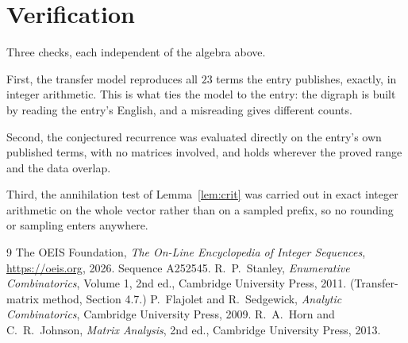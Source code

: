 \documentclass[11pt,a4paper]{article}
\theoremstyle{plain}
\theoremstyle{definition}
\begin{document}
\section{Verification}

Three checks, each independent of the algebra above.

First, the transfer model reproduces all $23$ terms the entry publishes, exactly, in
integer arithmetic. This is what ties the model to the entry: the digraph is built by reading
the entry's English, and a misreading gives different counts.

Second, the conjectured recurrence was evaluated directly on the entry's own published terms,
with no matrices involved, and holds wherever the proved range and the data overlap.

Third, the annihilation test of Lemma~\ref{lem:crit} was carried out in exact integer
arithmetic on the whole vector rather than on a sampled prefix, so no rounding or sampling
enters anywhere.

\begin{thebibliography}{9}
 The OEIS Foundation, \emph{The On-Line Encyclopedia of Integer
Sequences}, \url{https://oeis.org}, 2026. Sequence A252545.
 R.~P.~Stanley, \emph{Enumerative Combinatorics}, Volume 1, 2nd ed.,
Cambridge University Press, 2011. (Transfer-matrix method, Section 4.7.)
 P.~Flajolet and R.~Sedgewick, \emph{Analytic Combinatorics}, Cambridge
University Press, 2009.
 R.~A.~Horn and C.~R.~Johnson, \emph{Matrix Analysis}, 2nd ed., Cambridge
University Press, 2013.
\end{thebibliography}
\end{document}
